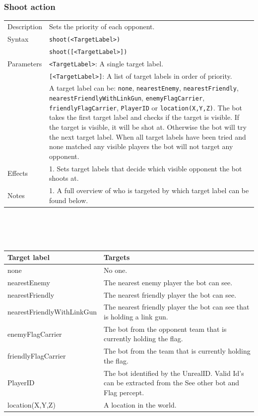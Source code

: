 \documentclass[11pt,a4paper]{article}
\begin{document}
\subsubsection*{Shoot action}
\begin{small}
\begin{tabular}{p{2cm}p{9cm}}
Description & Sets the priority of each opponent.\\
Syntax & \verb|shoot(<TargetLabel>)|\\
	& \verb|shoot([<TargetLabel>])|\\

Parameters 	& \verb|<TargetLabel>|: A single target label. \\
		& \verb|[<TargetLabel>]|: A list of target labels in order of priority.\\
		&  A target label can be: \verb|none|, \verb|nearestEnemy|, \verb|nearestFriendly|, \verb|nearestFriendlyWithLinkGun|, \verb|enemyFlagCarrier|, \verb|friendlyFlagCarrier|, \verb|PlayerID| or \verb|location(X,Y,Z)|. The bot takes the first target label and checks if the target is visible. If the target is visible, it will be shot at. Otherwise the bot will try the next target label. When all target labels have been tried and none matched any visible players the bot will not target any opponent.\\

Effects & 
	1.	Sets target labels that decide which visible opponent the bot shoots at.\\
Notes &
		1.	A full overview of who is targeted by which target label can be found below. \\


\end{tabular}
	\\\\\\

\begin{tabular}{|p{4cm}|p{7cm}|}	
	\hline
Target label & Targets\\
\hline
none & No one. \\
nearestEnemy & The nearest enemy player the bot can see. \\
nearestFriendly &  The nearest friendly player the bot can see. \\
nearestFriendlyWithLinkGun & The nearest friendly player the bot can see that is holding a link gun. \\
enemyFlagCarrier & The bot from the opponent team that is currently holding the flag. \\
friendlyFlagCarrier & The bot from the team that is currently holding the flag.\\
PlayerID & The bot identified by the UnrealID. Valid Id's can be extracted from the See other bot and Flag percept. \\
location(X,Y,Z) & A location in the world.\\
\hline
\end{tabular}
\end{small}
\end{document}
